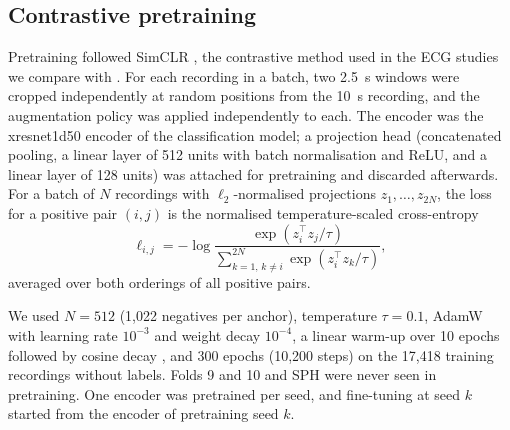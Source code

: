 \documentclass[preprint,12pt]{elsarticle}
\begin{document}
\subsection{Contrastive pretraining}
\label{sec:ssl}

Pretraining followed SimCLR \cite{chen2020simclr}, the contrastive method used in the ECG studies we compare with \cite{mehari2022,soltanieh2024ood,zeng2026}. For each recording in a batch, two 2.5~s windows were cropped independently at random positions from the 10~s recording, and the augmentation policy was applied independently to each. The encoder was the xresnet1d50 encoder of the classification model; a projection head (concatenated pooling, a linear layer of 512 units with batch normalisation and ReLU, and a linear layer of 128 units) was attached for pretraining and discarded afterwards. For a batch of $N$ recordings with $\ell_2$-normalised projections $z_1,\dots,z_{2N}$, the loss for a positive pair $(i,j)$ is the normalised temperature-scaled cross-entropy
\begin{equation}
\ell_{i,j} = -\log \frac{\exp(z_i^{\top} z_j/\tau)}{\sum_{k=1,\,k\neq i}^{2N} \exp(z_i^{\top} z_k/\tau)},
\end{equation}
averaged over both orderings of all positive pairs.

We used $N = 512$ (1,022 negatives per anchor), temperature $\tau = 0.1$, AdamW with learning rate $10^{-3}$ and weight decay $10^{-4}$, a linear warm-up over 10 epochs followed by cosine decay \cite{loshchilov2017sgdr}, and 300 epochs (10,200 steps) on the 17,418 training recordings without labels. Folds 9 and 10 and SPH were never seen in pretraining. One encoder was pretrained per seed, and fine-tuning at seed $k$ started from the encoder of pretraining seed $k$.
\end{document}
